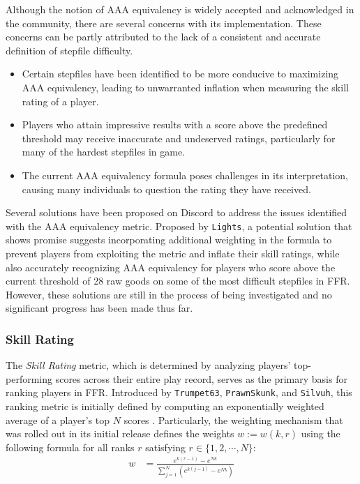 

Although the notion of AAA equivalency is widely accepted and acknowledged in the community, there are several concerns with its implementation. These concerns can be partly attributed to the lack of a consistent and accurate definition of stepfile difficulty.

\begin{itemize}
	\item Certain stepfiles have been identified to be more conducive to maximizing AAA equivalency, leading to unwarranted inflation when measuring the skill rating of a player.
	\item Players who attain impressive results with a score above the predefined threshold may receive inaccurate and undeserved ratings, particularly for many of the hardest stepfiles in game.
	\item The current AAA equivalency formula poses challenges in its interpretation, causing many individuals to question the rating they have received.
\end{itemize}

Several solutions have been proposed on Discord to address the issues identified with the AAA equivalency metric. Proposed by \texttt{Lights}, a potential solution that shows promise suggests incorporating additional weighting in the formula to prevent players from exploiting the metric and inflate their skill ratings, while also accurately recognizing AAA equivalency for players who score above the current threshold of 28 raw goods on some of the most difficult stepfiles in FFR. However, these solutions are still in the process of being investigated and no significant progress has been made thus far.

\subsubsection{Skill Rating}

The \textit{Skill Rating} metric, which is determined by analyzing players' top-performing scores across their entire play record, serves as the primary basis for ranking players in FFR. Introduced by \texttt{Trumpet63}, \texttt{PrawnSkunk}, and \texttt{Silvuh}, this ranking metric is initially defined by computing an exponentially weighted average of a player's top $N$ scores \cite{20150216}. Particularly, the weighting mechanism that was rolled out in its initial release defines the weights $w := w(k, r)$ using the following formula for all ranks $r$ satisfying $r \in \{1, 2, \cdots, N\}$:
\begin{align*}
	w & = \frac{e^{k(r-1)} - e^{Nk}}{\displaystyle \sum_{j = 1}^{N} \left(e^{k(j-1)} - e^{Nk}\right)}
\end{align*}



